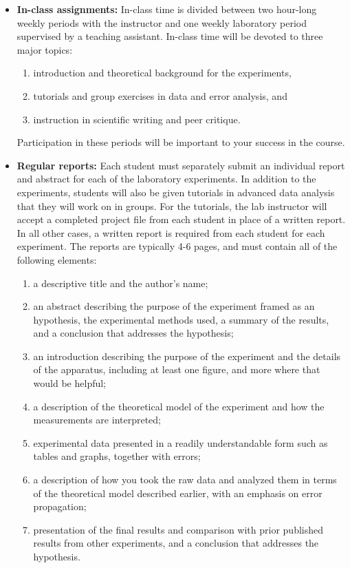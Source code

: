 \documentclass{revtex4}
\begin{document}
\begin{itemize}

\item
{\bf In-class assignments:} In-class time is divided between two hour-long
weekly periods with the instructor and one weekly laboratory period supervised
by a teaching assistant. In-class time will be devoted to three major topics:
\begin{enumerate}
\item
introduction and theoretical background for the experiments,
\item
tutorials and group exercises in data and error analysis, and
\item
instruction in scientific writing and peer critique.
\end{enumerate}
Participation in these periods will be important to your success in the course.

\item
{\bf Regular reports:} Each student must separately submit an
individual report and abstract for each of the laboratory experiments.
In addition to the experiments, students will also be given tutorials in
advanced data analysis that they will work on in groups.  For the tutorials,
the lab instructor will accept a completed project file from each student
in place of a written report.  In all other cases, a written report is
required from each student for each experiment.  The reports are typically
4-6 pages, and must contain all of the following elements:
\begin{enumerate}
\item
a descriptive title and the author's name;
\item
an abstract describing the purpose of the experiment
framed as an hypothesis, the experimental methods used,
a summary of the results, and a conclusion that addresses
the hypothesis;
\item
an introduction describing the purpose of the experiment and the details of
the apparatus, including at least one figure, and more where that would be
helpful;
\item
a description of the theoretical model of the experiment and how the
measurements are interpreted;
\item
experimental data presented in a readily understandable form such as tables
and graphs, together with errors;
\item
a description of how you took the raw data and analyzed them in terms of the
theoretical model described earlier, with an emphasis on error propagation;
\item
presentation of the final results and comparison with prior published results
from other experiments, and a conclusion that addresses the hypothesis.
\end{enumerate}


\end{itemize}
\end{document}
